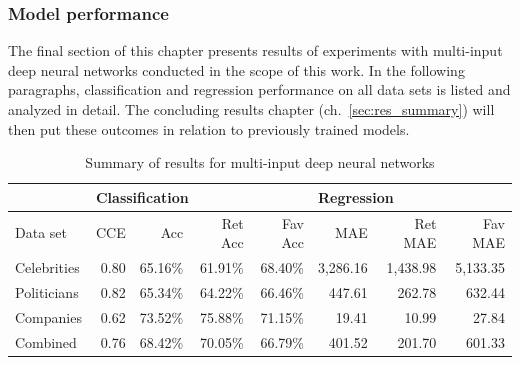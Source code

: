 \subsubsection{Model performance}
\label{sub:comb_performance}

The final section of this chapter presents results of experiments with multi-input
deep neural networks conducted in the scope of this work.
In the following paragraphs, classification and regression performance on all
data sets is listed and analyzed in detail.
The concluding results chapter (ch.~\ref{sec:res_summary}) will then put these
outcomes in relation to previously trained models.

\begin{table}
  \begin{tabular}{lrrrrrrr}
    \toprule
    & \multicolumn{4}{l}{Classification} & \multicolumn{3}{l}{Regression} \\
    \midrule
    Data set & CCE & Acc & Ret Acc & Fav Acc & MAE & Ret MAE & Fav MAE \\
    \midrule
    Celebrities & 0.80 & 65.16\% & 61.91\% & 68.40\% & 3,286.16 & 1,438.98 & 5,133.35 \\
    Politicians & 0.82 & 65.34\% & 64.22\% & 66.46\% & 447.61 & 262.78 & 632.44 \\
    Companies & 0.62 & 73.52\% & 75.88\% & 71.15\% & 19.41 & 10.99 & 27.84 \\
    Combined & 0.76 & 68.42\% & 70.05\% & 66.79\% & 401.52 & 201.70 & 601.33 \\
    \bottomrule
  \end{tabular}
  \caption{Summary of results for multi-input deep neural networks}
  \label{tab:deep2_results}
\end{table}


